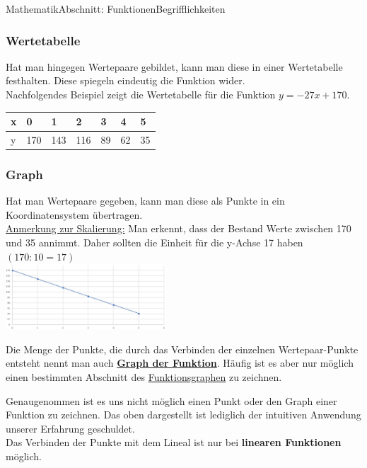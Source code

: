 \documentclass[11pt,twocolumn,oneside,openany,headings=optiontotoc,11pt,numbers=noenddot]{article}
\begin{document}
\begin{worksheet}{Mathematik}{Abschnitt: Funktionen}{Begrifflichkeiten}
		\subsubsection*{Wertetabelle}
		Hat man hingegen Wertepaare gebildet, kann man diese in einer Wertetabelle festhalten. Diese spiegeln eindeutig die Funktion wider.\\
		Nachfolgendes Beispiel zeigt die Wertetabelle für die Funktion \(y = -27x+170\).\\
		\par\bigskip\noindent
		\begin{tabularx}{0.5\textwidth}{|l|X|X|X|X|X|X|}
			\hline
			x & 0 & 1 & 2 & 3 & 4 & 5\\
			\hline
			y & 170 & 143 & 116 & 89 & 62 & 35\\
			\hline
		\end{tabularx}
		\subsubsection*{Graph}
		Hat man Wertepaare gegeben, kann man diese als Punkte in ein Koordinatensystem übertragen.\\
		\underline{Anmerkung zur Skalierung:} Man erkennt, dass der Bestand Werte zwischen 170 und 35 annimmt. Daher sollten die Einheit für die y-Achse 17 haben \((170:10 = 17)\)\\
		\includegraphics[width=0.45\textwidth]{../99_Bilder/bierkoord.jpg}\\
		\par\bigskip\noindent
		Die Menge der Punkte, die durch das Verbinden der einzelnen Wertepaar-Punkte entsteht nennt man auch \underline{\textbf{Graph der Funktion}}. Häufig ist es aber nur möglich einen bestimmten Abschnitt des \underline{Funktionsgraphen} zu zeichnen.\\
		\par\bigskip\noindent
		Genaugenommen ist es uns nicht möglich einen Punkt oder den Graph einer Funktion zu zeichnen. Das oben dargestellt ist lediglich der intuitiven Anwendung unserer Erfahrung geschuldet.\\
		Das Verbinden der Punkte mit dem Lineal ist nur bei \textbf{linearen Funktionen} möglich.\\
		\textit{\color{red}{Im Allgemeinen gilt: Das Verwenden des Lineals zum Verbinden der Punkte ist streng verboten!}}\\

\end{worksheet}
\end{document}
